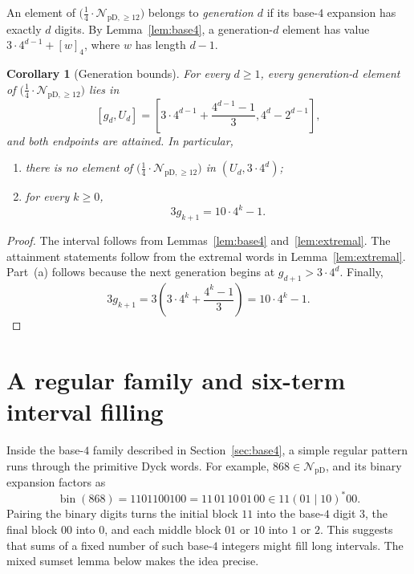 \documentclass[12pt]{article}
\theoremstyle{plain}
\newtheorem{corollary}[theorem]{Corollary}
\theoremstyle{definition}
\theoremstyle{plain}
\newcommand{\NpD}{\mathcal{N}_{\mathrm{pD}}}
\newcommand{\Pset}{%
  \bigl(\tfrac{1}{4}\cdot\mathcal{N}_{\mathrm{pD},\geq 12}\bigr)%
}
\begin{document}
An element of $\Pset$ belongs to \emph{generation $d$} if its base-$4$
expansion has exactly $d$ digits.  By Lemma~\ref{lem:base4}, a generation-$d$
element has value $3\cdot4^{d-1}+[w]_4$, where $w$ has length $d-1$.

\begin{corollary}[Generation bounds]\label{cor:gen}
For every $d\geq1$, every generation-$d$ element of $\Pset$ lies in
\begin{equation}\label{eq:generation-interval}
  [g_d,U_d]
  =\left[
  3\cdot4^{d-1}+\frac{4^{d-1}-1}{3},
  4^d-2^{d-1}
  \right],
\end{equation}
and both endpoints are attained.  In particular,
\begin{enumerate}[label=\textup{(\alph*)}]
\item there is no element of $\Pset$ in $(U_d,3\cdot4^d)$;
\item for every $k\geq0$,
\begin{equation}\label{eq:three-g}
  3g_{k+1}=10\cdot4^k-1.
\end{equation}
\end{enumerate}
\end{corollary}

\begin{proof}
The interval follows from Lemmas~\ref{lem:base4} and~\ref{lem:extremal}.  The
attainment statements follow from the extremal words in
Lemma~\ref{lem:extremal}.  Part~(a) follows because the next generation begins
at $g_{d+1}>3\cdot4^d$.  Finally,
\[
  3g_{k+1}
  =3\left(3\cdot4^k+\frac{4^k-1}{3}\right)
  =10\cdot4^k-1.
\]
\end{proof}

\section{A regular family and six-term interval filling}\label{sec:regular}

Inside the base-$4$ family described in Section~\ref{sec:base4}, a simple regular pattern runs through the primitive Dyck words.  For
example, $868\in\NpD$, and its binary expansion factors as
\[
 \operatorname{bin}(868)=1101100100=11\,01\,10\,01\,00
 \in 11(01\mid10)^*00 .
\]
Pairing the binary digits turns the initial block $11$ into the base-$4$
digit $3$, the final block $00$ into $0$, and each middle block $01$ or
$10$ into $1$ or $2$.  This suggests that sums of a fixed number of such
base-$4$ integers might fill long intervals.  The mixed sumset lemma
below makes the idea precise.
\end{document}
